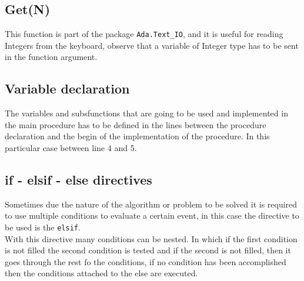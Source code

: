 \documentclass[paper=a4, fontsize=11pt]{scrartcl} %
\numberwithin{equation}{section} %
\numberwithin{figure}{section} %
\numberwithin{table}{section} %
\begin{document}
\subsection{Get(N)}
This function is part of the package \verb|Ada.Text_IO|, and it is useful for reading Integers from the keyboard, observe that a variable of Integer type has to be sent in the function argument. 

\subsection{Variable declaration}
The variables and subsfunctions that are going to be used and implemented in the main procedure has to be defined in the lines between the procedure declaration and the begin of the implementation of the procedure. In this particular case between line 4 and 5.

\subsection{if - elsif - else  directives}
Sometimes due the nature of the algorithm or problem to be solved it is required to use multiple conditions to evaluate a certain event, in this case the directive to be used is the \verb|elsif|. \\

With this directive many conditions can be nested. In which if the first condition is not filled the second condition is tested and if the second is not filled, then it goes through the rest fo the conditions, if no condition has been accomplished then the conditions attached to the else are executed. 
\end{document}
